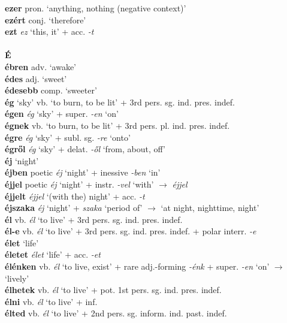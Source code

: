 \documentclass[11pt]{article}
\begin{document}
\textbf{ezer} pron. `anything, nothing (negative context)' \\
\textbf{ezért} conj. `therefore' \\
\textbf{ezt} \emph{ez} `this, it' + acc. \emph{-t} \\
\ \\
\noindent \textbf{\large É} \\
\textbf{ébren} adv. `awake' \\
\textbf{édes} adj. `sweet' \\
\textbf{édesebb} comp. `sweeter' \\
\textbf{ég} `sky' \textbar\textbar{} vb. `to burn, to be lit' + 3rd
pers. sg. ind. pres. indef. \\
\textbf{égen} \emph{ég} `sky' + super. \emph{-en} `on' \\
\textbf{égnek} vb. `to burn, to be lit' + 3rd pers. pl. ind. pres. indef. \\
\textbf{égre} \emph{ég} `sky' + subl. sg. \emph{-re} `onto' \\
\textbf{égről} \emph{ég} `sky' + delat. \emph{-ől} `from, about, off' \\
\textbf{éj} `night' \\
\textbf{éjben} poetic \emph{éj} `night' + inessive \emph{-ben} `in' \\
\textbf{éjjel} poetic \emph{éj} `night' + instr. \emph{-vel}
  `with' $\rightarrow$ \emph{éjjel} \\
\textbf{éjjelt} \emph{éjjel} `(with the) night' + acc. \emph{-t} \\
\textbf{éjszaka} \emph{éj} `night' + \emph{szaka} `period of'
    $\rightarrow$ `at night, nighttime, night' \\
\textbf{él} vb. \emph{él} `to live' + 3rd
pers. sg. ind. pres. indef. \\
\textbf{él-e} vb. \emph{él} `to live' + 3rd
pers. sg. ind. pres. indef. + polar interr. \emph{-e} \\
\textbf{élet} `life' \\
\textbf{életet} \emph{élet} `life' + acc. \emph{-et} \\
\textbf{élénken} vb. \emph{él} `to live, exist' + rare
adj.\hyp{}forming \emph{-énk} + super. \emph{-en} `on' $\rightarrow$
`lively' \\
\textbf{élhetek} vb. \emph{él} `to live' + pot. 1st
pers. sg. ind. pres. indef. \\
\textbf{élni} vb. \emph{él} `to live' + inf. \\
\textbf{élted} vb. \emph{él} `to live' + 2nd
pers. sg. inform. ind. past. indef. \\
\end{document}
